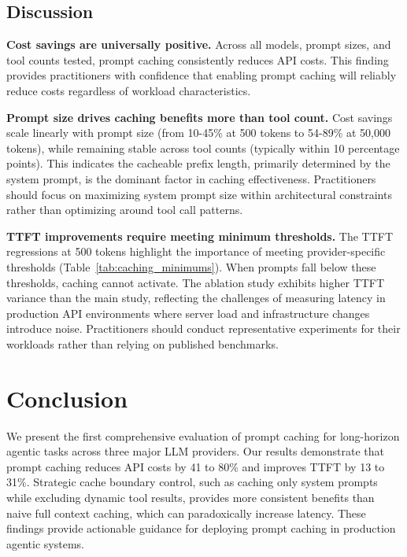 \documentclass{article}
\theoremstyle{plain}
\theoremstyle{definition}
\theoremstyle{remark}
\begin{document}
\subsection{Discussion}
\label{subsec:ablation_discussion}

\textbf{Cost savings are universally positive.} Across all models, prompt sizes, and tool counts tested, prompt caching consistently reduces API costs. This finding provides practitioners with confidence that enabling prompt caching will reliably reduce costs regardless of workload characteristics.

\textbf{Prompt size drives caching benefits more than tool count.} Cost savings scale linearly with prompt size (from 10-45\% at 500 tokens to 54-89\% at 50,000 tokens), while remaining stable across tool counts (typically within 10 percentage points). This indicates the cacheable prefix length, primarily determined by the system prompt, is the dominant factor in caching effectiveness. Practitioners should focus on maximizing system prompt size within architectural constraints rather than optimizing around tool call patterns.

\textbf{TTFT improvements require meeting minimum thresholds.} The TTFT regressions at 500 tokens highlight the importance of meeting provider-specific thresholds (Table~\ref{tab:caching_minimums}). When prompts fall below these thresholds, caching cannot activate. The ablation study exhibits higher TTFT variance than the main study, reflecting the challenges of measuring latency in production API environments where server load and infrastructure changes introduce noise. Practitioners should conduct representative experiments for their workloads rather than relying on published benchmarks.

\section{Conclusion}
\label{sec:conclusion}

We present the first comprehensive evaluation of prompt caching for long-horizon agentic tasks across three major LLM providers. Our results demonstrate that prompt caching reduces API costs by 41 to 80\% and improves TTFT by 13 to 31\%. Strategic cache boundary control, such as caching only system prompts while excluding dynamic tool results, provides more consistent benefits than naive full context caching, which can paradoxically increase latency. These findings provide actionable guidance for deploying prompt caching in production agentic systems.
\end{document}

